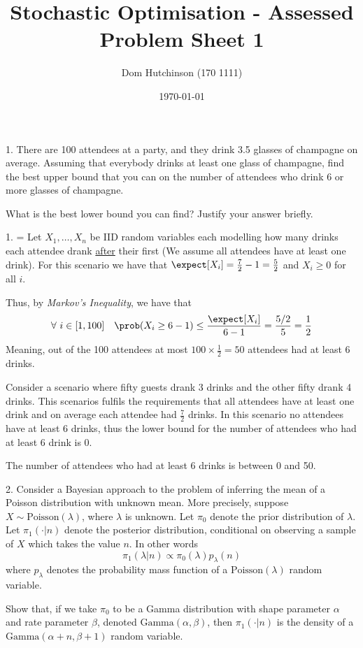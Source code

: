 \documentclass[11pt,a4paper]{article}
\begin{document}
\questionsfalse

\title{Stochastic Optimisation - Assessed Problem Sheet 1}
\author{Dom Hutchinson (170 1111)}
\date{\today}
\maketitle


\begin{question}{1.}
  There are 100 attendees at a party, and they drink 3.5 glasses of champagne on average. Assuming that everybody drinks at least one glass of champagne, find the best upper bound that you can on the number of attendees who drink 6 or more glasses of champagne.
  \par What is the best lower bound you can find? Justify your answer briefly.
\end{question}

\begin{answer}{1.}
  \everymath={}
  Let $X_1,\dots,X_n$ be IID random variables each modelling how many drinks each attendee drank \underline{after} their first (We assume all attendees have at least one drink). For this scenario we have that $\expect[X_i]=\frac72-1=\frac52$ and $X_i\geq0$ for all $i$.
  \par Thus, by \textit{Markov's Inequality}, we have that
  \[ \forall\ i\in[1,100]\quad\prob(X_i\geq6-1)\leq\frac{\expect[X_i]}{6-1}=\frac{5/2}5=\frac12 \]
  Meaning, out of the 100 attendees at most $100\times\frac12=50$ attendees had at least 6 drinks.

  \par Consider a scenario where fifty guests drank 3 drinks and the other fifty drank 4 drinks. This scenarios fulfils the requirements that all attendees have at least one drink and on average each attendee had $\frac72$ drinks. In this scenario no attendees have at least 6 drinks, thus the lower bound for the number of attendees who had at least 6 drink is 0.
  \par The number of attendees who had at least 6 drinks is between 0 and 50.
\end{answer}

\begin{question}{2.}
  Consider a Bayesian approach to the problem of inferring the mean of a Poisson distribution with unknown mean. More precisely, suppose $X\sim\text{Poisson}(\lambda)$, where $\lambda$ is unknown. Let $\pi_0$ denote the prior distribution of $\lambda$. Let $\pi_1(\cdot|n)$ denote the posterior distribution, conditional on observing a sample of $X$ which takes the value $n$. In other words
  \[ \pi_1(\lambda|n)\propto \pi_0(\lambda)p_\lambda(n) \]
  where $p_\lambda$ denotes the probability mass function of a $\text{Poisson}(\lambda)$ random variable.
  \par Show that, if we take $\pi_0$ to be a Gamma distribution with shape parameter $\alpha$ and rate parameter $\beta$, denoted $\text{Gamma}(\alpha,\beta)$, then $\pi_1(\cdot|n)$ is the density of a $\text{Gamma}(\alpha+n,\beta+1)$ random variable.
\end{question}
\end{document}
